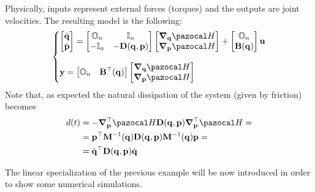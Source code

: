 \begin{exmp}
	Physically, inputs represent external forces (torques) and the outputs are joint velocities. The resulting model is the following:
	\begin{equation}\label{eq:nDOF}
	    \left\{
	        \begin{matrix*}[l]
	        \begin{bmatrix}	\dot{\q}\\\dot{\p}\end{bmatrix} 
        	=
	        \begin{bmatrix}\mathbb{O}_n&\mathbb{I}_n\\-\mathbb{I}_n&-\mathbf{D}(\q,\p)\end{bmatrix}
	        \begin{bmatrix}\bm{\nabla}_{\q}\Ha\\\bm{\nabla}_{\p}\Ha\end{bmatrix}
	        +
	        \begin{bmatrix}\mathbb{O}_n\\\mathbf{B}(\q)\end{bmatrix}\ub\\\\
	        \yb = \begin{bmatrix}\mathbb{O}_n&\mathbf{B}^\top(\q)\end{bmatrix}\begin{bmatrix}\bm{\nabla}_{\q}\Ha\\\bm{\nabla}_{\p}\Ha\end{bmatrix}
	    \end{matrix*}
	    \right.
	\end{equation}
	Note that, as expected the natural dissipation of the system (given by friction) becomes
	\begin{align}
	    d(t) &= -\bm{\nabla}_\p^\top\Ha\mathbf{D}(\q,\p)\bm{\nabla}_\p^\top\Ha =\\ &=\p^\top\mathbf{M}^{-1}(\q)\mathbf{D}(\q,\p)\mathbf{M}^{-1}(\q)\p =\\
	    &= \dot{\q}^\top\mathbf{D}(\q,\p)\dot{\q}
	\end{align}
\end{exmp}
%
The linear specialization of the previous example will be now introduced in order to show some numerical simulations.
%
